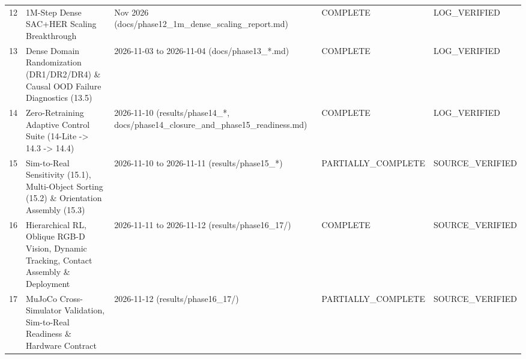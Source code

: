\begin{longtable}{l l l l l}
12 & 1M-Step Dense SAC+HER Scaling Breakthrough & Nov 2026 (docs/phase12\_1m\_dense\_scaling\_report.md) & COMPLETE & LOG\_VERIFIED \\
13 & Dense Domain Randomization (DR1/DR2/DR4) \& Causal OOD Failure Diagnostics (13.5) & 2026-11-03 to 2026-11-04 (docs/phase13\_*.md) & COMPLETE & LOG\_VERIFIED \\
14 & Zero-Retraining Adaptive Control Suite (14-Lite -> 14.3 -> 14.4) & 2026-11-10 (results/phase14\_*, docs/phase14\_closure\_and\_phase15\_readiness.md) & COMPLETE & LOG\_VERIFIED \\
15 & Sim-to-Real Sensitivity (15.1), Multi-Object Sorting (15.2) \& Orientation Assembly (15.3) & 2026-11-10 to 2026-11-11 (results/phase15\_*) & PARTIALLY\_COMPLETE & SOURCE\_VERIFIED \\
16 & Hierarchical RL, Oblique RGB-D Vision, Dynamic Tracking, Contact Assembly \& Deployment & 2026-11-11 to 2026-11-12 (results/phase16\_17/) & COMPLETE & SOURCE\_VERIFIED \\
17 & MuJoCo Cross-Simulator Validation, Sim-to-Real Readiness \& Hardware Contract & 2026-11-12 (results/phase16\_17/) & PARTIALLY\_COMPLETE & SOURCE\_VERIFIED \\
\bottomrule \end{longtable}